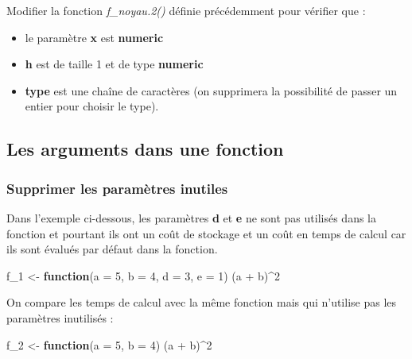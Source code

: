 \documentclass[
]{book}
\newenvironment{Shaded}{\begin{snugshade}}{\end{snugshade}}
\newcommand{\AttributeTok}[1]{\textcolor[rgb]{0.77,0.63,0.00}{#1}}
\newcommand{\ControlFlowTok}[1]{\textcolor[rgb]{0.13,0.29,0.53}{\textbf{#1}}}
\newcommand{\DecValTok}[1]{\textcolor[rgb]{0.00,0.00,0.81}{#1}}
\newcommand{\NormalTok}[1]{#1}
\newcommand{\OtherTok}[1]{\textcolor[rgb]{0.56,0.35,0.01}{#1}}
\newcommand{\SpecialCharTok}[1]{\textcolor[rgb]{0.00,0.00,0.00}{#1}}
\theoremstyle{definition}
\theoremstyle{definition}
\theoremstyle{definition}
\theoremstyle{definition}
\theoremstyle{remark}
\begin{document}
Modifier la fonction \emph{f\_noyau.2()} définie précédemment pour vérifier que :

\begin{itemize}
\item
  le paramètre \textbf{x} est \textbf{numeric}
\item
  \textbf{h} est de taille 1 et de type \textbf{numeric}
\item
  \textbf{type} est une chaîne de caractères (on supprimera la possibilité de passer un entier pour choisir le type).
\end{itemize}

\hypertarget{les-arguments-dans-une-fonction}{%
\subsection{Les arguments dans une fonction}\label{les-arguments-dans-une-fonction}}

\hypertarget{supprimer-les-paramuxe8tres-inutiles}{%
\subsubsection{Supprimer les paramètres inutiles}\label{supprimer-les-paramuxe8tres-inutiles}}

Dans l'exemple ci-dessous, les paramètres \textbf{d} et \textbf{e} ne sont pas utilisés dans la fonction et pourtant ils ont un coût de stockage et un coût en temps de calcul car ils sont évalués par défaut dans la fonction.

\begin{Shaded}
\begin{Highlighting}[]
\NormalTok{f\_1 }\OtherTok{\textless{}{-}} \ControlFlowTok{function}\NormalTok{(}\AttributeTok{a =} \DecValTok{5}\NormalTok{, }\AttributeTok{b =} \DecValTok{4}\NormalTok{, }\AttributeTok{d =} \DecValTok{3}\NormalTok{, }\AttributeTok{e =} \DecValTok{1}\NormalTok{)}
\NormalTok{  (a }\SpecialCharTok{+}\NormalTok{ b)}\SpecialCharTok{\^{}}\DecValTok{2}
\end{Highlighting}
\end{Shaded}

On compare les temps de calcul avec la même fonction mais qui n'utilise pas les paramètres inutilisés :

\begin{Shaded}
\begin{Highlighting}[]
\NormalTok{f\_2 }\OtherTok{\textless{}{-}} \ControlFlowTok{function}\NormalTok{(}\AttributeTok{a =} \DecValTok{5}\NormalTok{, }\AttributeTok{b =} \DecValTok{4}\NormalTok{)}
\NormalTok{  (a }\SpecialCharTok{+}\NormalTok{ b)}\SpecialCharTok{\^{}}\DecValTok{2}
\end{Highlighting}
\end{Shaded}
\end{document}
